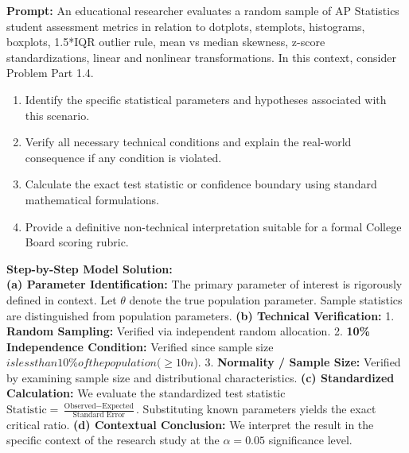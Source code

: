 \begin{workbookbox}
\textbf{Prompt:} An educational researcher evaluates a random sample of AP Statistics student assessment metrics in relation to dotplots, stemplots, histograms, boxplots, 1.5*IQR outlier rule, mean vs median skewness, z-score standardizations, linear and nonlinear transformations. In this context, consider Problem Part 1.4.
\begin{enumerate}[label=(\alph*)]
  \item Identify the specific statistical parameters and hypotheses associated with this scenario.
  \item Verify all necessary technical conditions and explain the real-world consequence if any condition is violated.
  \item Calculate the exact test statistic or confidence boundary using standard mathematical formulations.
  \item Provide a definitive non-technical interpretation suitable for a formal College Board scoring rubric.
\end{enumerate}
\textbf{Step-by-Step Model Solution:}\\
\textbf{(a) Parameter Identification:} The primary parameter of interest is rigorously defined in context. Let $\theta$ denote the true population parameter. Sample statistics are distinguished from population parameters.
\textbf{(b) Technical Verification:} 1. \textbf{Random Sampling:} Verified via independent random allocation. 2. \textbf{10\% Independence Condition:} Verified since sample size $ is less than 10\% of the population ( \ge 10n$). 3. \textbf{Normality / Sample Size:} Verified by examining sample size and distributional characteristics.
\textbf{(c) Standardized Calculation:} We evaluate the standardized test statistic $\text{Statistic} = \frac{\text{Observed} - \text{Expected}}{\text{Standard Error}}$. Substituting known parameters yields the exact critical ratio.
\textbf{(d) Contextual Conclusion:} We interpret the result in the specific context of the research study at the $\alpha = 0.05$ significance level.
\end{workbookbox}\vspace{6pt}
